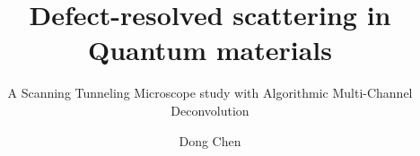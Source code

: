\documentclass[balanced,twoside,11pt]{ubcdiss}
\title{Defect-resolved scattering in Quantum materials}
\subtitle{A Scanning Tunneling Microscope study with Algorithmic Multi-Channel Deconvolution}
\author{Dong Chen}
\begin{document}
		
		
		\maketitle
		
		\makecommitteepage
		
		

		
		

		
		

		
		\tableofcontents
		
		\listoftables
		
		\listoffigures
		
		
		
		
		
		
		
		\mainmatter
		
		\acresetall	%
		
		
		
\end{document}
